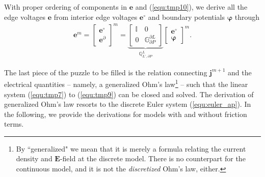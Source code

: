 \documentclass{article}
\begin{document}
With proper ordering of components in $\mathbf{e}$ and (\ref{equ:tmp10}), we derive all the edge voltages $\mathbf{e}$ from interior edge voltages $\mathbf{e}^\circ$ and boundary potentials $\bm{\varphi}$ through 
\begin{align*}
    \mathbf{e}^m =
    \begin{bmatrix}
    \mathbf{e}^\circ \\ \mathbf{e}^\partial
    \end{bmatrix}^m =
    \underbrace{
    \begin{bmatrix}
    \mathbb{I} & 0 \\ 0 & \mathbb{G}^{\partial L}_{\partial P}
    \end{bmatrix}}_{\mathbb{Q}_{L^\circ,\partial P}^{L}}
    \begin{bmatrix}
    \mathbf{e}^\circ \\ \bm{\varphi}
    \end{bmatrix}^m.
\end{align*}

The last piece of the puzzle to be filled is the relation connecting $\mathbf{j}^{m+1}$ and the electrical quantities -- namely, a generalized Ohm's law\footnote{By ``generalized" we mean that it is merely a formula relating the current density and $\mathbf{E}$-field at the discrete model. There is no counterpart for the continuous model, and it is not the \emph{discretized} Ohm's law, either.} -- such that the linear system (\ref{equ:tmp7}) to (\ref{equ:tmp9}) can be closed and solved. The derivation of generalized Ohm's law resorts to the discrete Euler system (\ref{equ:euler_ap}). In the following, we provide the derivations for models with and without friction terms. 
\end{document}

